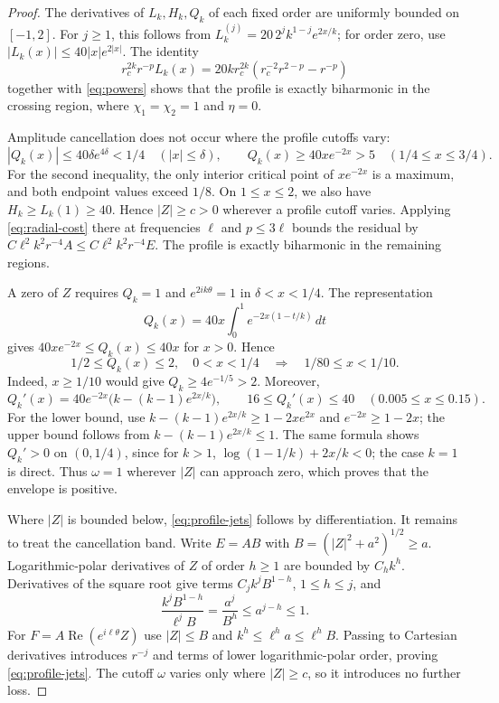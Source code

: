 \documentclass[11pt,twoside,leqno]{article}
\numberwithin{equation}{section}
\theoremstyle{definition}
\theoremstyle{remark}
\begin{document}
\begin{proof}
The derivatives of $L_k,H_k,Q_k$ of each fixed order are uniformly
bounded on $[-1,2]$. For $j\ge1$, this follows from
$L_k^{(j)}=20\,2^jk^{1-j}e^{2x/k}$; for order zero, use
$|L_k(x)|\le40|x|e^{2|x|}$.
The identity
\begin{equation}\label{eq:exact-branches}
 r_c^{2k}r^{-p}L_k(x)
 =20kr_c^{2k}(r_c^{-2}r^{2-p}-r^{-p})
\end{equation}
together with \eqref{eq:powers} shows that the profile is exactly
biharmonic in the crossing region, where $\chi_1=\chi_2=1$ and $\eta=0$.

Amplitude cancellation does not occur where the profile cutoffs vary:
\[
 |Q_k(x)|\le40\delta e^{4\delta}<1/4\quad(|x|\le\delta),
 \qquad Q_k(x)\ge40xe^{-2x}>5\quad(1/4\le x\le3/4).
\]
For the second inequality, the only interior critical point of
$xe^{-2x}$ is a maximum, and both endpoint values exceed $1/8$.
On $1\le x\le2$, we also have $H_k\ge L_k(1)\ge40$.
Hence $|Z|\ge c>0$ wherever a profile cutoff varies. Applying
\eqref{eq:radial-cost} there at frequencies $\ell$ and $p\le3\ell$
bounds the residual by
$C\ell^2k^2r^{-4}A\le C\ell^2k^2r^{-4}E$.
The profile is exactly biharmonic in the remaining regions.

A zero of $Z$ requires $Q_k=1$ and $e^{2ik\theta}=1$ in
$\delta<x<1/4$. The representation
\begin{equation}\label{eq:Q-integral}
 Q_k(x)=40x\int_0^1e^{-2x(1-t/k)}\,dt
\end{equation}
gives $40xe^{-2x}\le Q_k(x)\le40x$ for $x>0$. Hence
\begin{equation}\label{eq:crossing-band}
 1/2\le Q_k(x)\le2,\quad 0<x<1/4
 \quad\Longrightarrow\quad 1/80\le x<1/10.
\end{equation}
Indeed, $x\ge1/10$ would give $Q_k\ge4e^{-1/5}>2$.
Moreover,
\begin{equation}\label{eq:Qprime}
 Q_k'(x)=40e^{-2x}\bigl(k-(k-1)e^{2x/k}\bigr),\qquad
 16\le Q_k'(x)\le40\quad(0.005\le x\le0.15).
\end{equation}
For the lower bound, use
$k-(k-1)e^{2x/k}\ge1-2xe^{2x}$ and
$e^{-2x}\ge1-2x$; the upper bound follows from
$k-(k-1)e^{2x/k}\le1$. The same formula shows $Q_k'>0$
on $(0,1/4)$, since for $k>1$,
$\log(1-1/k)+2x/k<0$; the case $k=1$ is direct.
Thus $\omega=1$ wherever $|Z|$ can approach zero, which proves that
the envelope is positive.

Where $|Z|$ is bounded below, \eqref{eq:profile-jets} follows by
differentiation. It remains to treat the cancellation band. Write
$E=AB$ with $B=(|Z|^2+a^2)^{1/2}\ge a$.
Logarithmic-polar derivatives of $Z$ of order $h\ge1$ are bounded by
$C_hk^h$. Derivatives of the square root give terms
$C_jk^jB^{1-h}$, $1\le h\le j$, and
\[
 \frac{k^jB^{1-h}}{\ell^jB}=\frac{a^j}{B^h}\le a^{j-h}\le1.
\]
For $F=A\operatorname{Re}(e^{i\ell\theta}Z)$ use $|Z|\le B$
and $k^h\le\ell^ha\le\ell^hB$. Passing to Cartesian derivatives introduces $r^{-j}$ and terms of
lower logarithmic-polar order, proving \eqref{eq:profile-jets}.
The cutoff $\omega$ varies only where $|Z|\ge c$, so it introduces
no further loss.


\end{proof}
\end{document}
